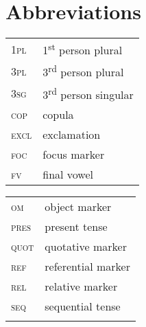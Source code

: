 \documentclass[output=paper]{langsci/langscibook}
\begin{document}
\section*{Abbreviations}

\begin{tabularx}{.45\textwidth}{lX}
\textsc{1pl} & 1\textsuperscript{st} person plural \\
\textsc{3pl} & 3\textsuperscript{rd} person plural \\
\textsc{3sg} & 3\textsuperscript{rd} person singular \\
\textsc{cop} & copula \\
\textsc{excl} & exclamation \\
\textsc{foc} & focus marker \\
\textsc{fv} & final vowel \\
\end{tabularx}
\begin{tabularx}{.45\textwidth}{lX}
\textsc{om} & object marker \\
\textsc{pres} & present tense \\
\textsc{quot} & quotative marker \\
\textsc{ref} & referential marker \\
\textsc{rel} & relative marker \\
\textsc{seq} & sequential tense \\
\\
\end{tabularx}



{\sloppy
\printbibliography[heading=subbibliography,notkeyword=this]
}
\end{document}
